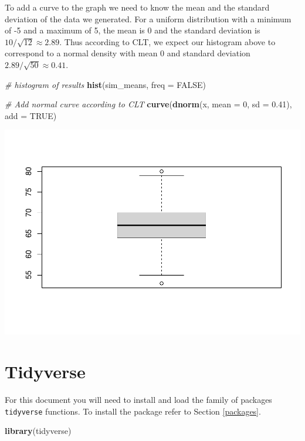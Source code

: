\documentclass[
]{book}
\newenvironment{Shaded}{\begin{snugshade}}{\end{snugshade}}
\newcommand{\CommentTok}[1]{\textcolor[rgb]{0.56,0.35,0.01}{\textit{#1}}}
\newcommand{\DataTypeTok}[1]{\textcolor[rgb]{0.13,0.29,0.53}{#1}}
\newcommand{\DecValTok}[1]{\textcolor[rgb]{0.00,0.00,0.81}{#1}}
\newcommand{\FloatTok}[1]{\textcolor[rgb]{0.00,0.00,0.81}{#1}}
\newcommand{\KeywordTok}[1]{\textcolor[rgb]{0.13,0.29,0.53}{\textbf{#1}}}
\newcommand{\NormalTok}[1]{#1}
\newcommand{\OtherTok}[1]{\textcolor[rgb]{0.56,0.35,0.01}{#1}}
\begin{document}
To add a curve to the graph we need to know the mean and the standard deviation of the data we generated. For a uniform distribution with a minimum of -5 and a maximum of 5, the mean is 0 and the standard deviation is \(10/\sqrt{12} \approx 2.89\). Thus according to CLT, we expect our histogram above to correspond to a normal density with mean 0 and standard deviation \(2.89/\sqrt{50} \approx 0.41\).

\begin{Shaded}
\begin{Highlighting}[]
\CommentTok{# histogram of results}
\KeywordTok{hist}\NormalTok{(sim_means, }\DataTypeTok{freq =} \OtherTok{FALSE}\NormalTok{)}

\CommentTok{# Add normal curve according to CLT}
\KeywordTok{curve}\NormalTok{(}\KeywordTok{dnorm}\NormalTok{(x, }\DataTypeTok{mean =} \DecValTok{0}\NormalTok{, }\DataTypeTok{sd =} \FloatTok{0.41}\NormalTok{), }\DataTypeTok{add =} \OtherTok{TRUE}\NormalTok{)}
\end{Highlighting}
\end{Shaded}

\includegraphics{_main_files/figure-latex/unnamed-chunk-230-1.pdf}

\hypertarget{tidyverse}{%
\chapter{Tidyverse}\label{tidyverse}}

For this document you will need to install and load the family of packages \texttt{tidyverse} functions. To install the package refer to Section \ref{packages}.

\begin{Shaded}
\begin{Highlighting}[]
\KeywordTok{library}\NormalTok{(tidyverse)}
\end{Highlighting}
\end{Shaded}
\end{document}
